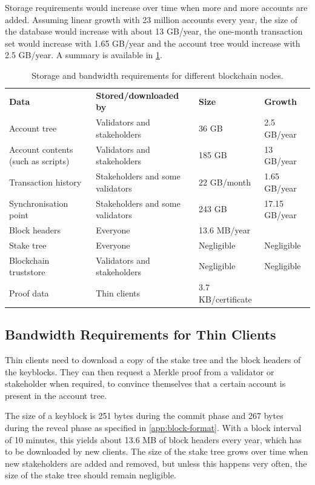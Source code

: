 \documentclass{style/kththesis}
\begin{document}
Storage requirements would increase over time when more and more accounts are added. Assuming linear growth with 23 million accounts every year, the size of the database would increase with about 13 GB/year, the one-month transaction set would increase with 1.65 GB/year and the account tree would increase with 2.5 GB/year. A summary is available in \cref{tab:storage}.

\begin{table}
\ifbook
\scriptsize
\fi
\label{tab:storage}
\caption{Storage and bandwidth requirements for different blockchain nodes.}
\begin{tabularx}{\textwidth}{XXXX}
\textbf{Data} & \textbf{Stored/downloaded by} & \textbf{Size} & \textbf{Growth} \\
\cmidrule(r){1-4}
Account tree & Validators and stakeholders & 36 GB & 2.5 GB/year \\
Account contents (such as scripts) & Validators and stakeholders & 185 GB & 13 GB/year  \\
Transaction history & Stakeholders and some validators & 22 GB/month & 1.65 GB/year \\
Synchronisation point & Stakeholders and some validators & 243 GB & 17.15 GB/year \\
Block headers & Everyone & 13.6 MB/year & \\
Stake tree & Everyone & Negligible & Negligible \\
Blockchain truststore & Validators and stakeholders & Negligible & Negligible \\
Proof data & Thin clients & 3.7 KB/certificate & \\
\end{tabularx}
\end{table}

\subsection{Bandwidth Requirements for Thin Clients}
Thin clients need to download a copy of the stake tree and the block headers of the keyblocks. They can then request a Merkle proof from a validator or stakeholder when required, to convince themselves that a certain account is present in the account tree.

The size of a keyblock is 251 bytes during the commit phase and 267 bytes during the reveal phase as specified in \cref{app:block-format}. With a block interval of 10 minutes, this yields about 13.6 MB of block headers every year, which has to be downloaded by new clients. The size of the stake tree grows over time when new stakeholders are added and removed, but unless this happens very often, the size of the stake tree should remain negligible.
\end{document}
